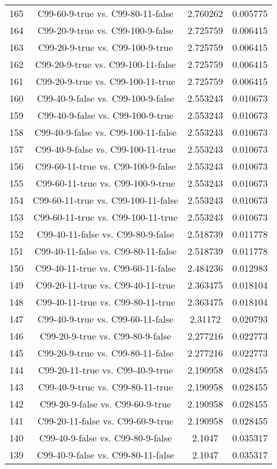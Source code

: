 \documentclass[a4paper,10pt]{article}
\begin{document}
\begin{landscape}
\begin{table}[!htp]
\begin{tabular}{cccc}
165&C99-60-9-true vs. C99-80-11-false&2.760262&0.005775\\
164&C99-20-9-true vs. C99-100-9-false&2.725759&0.006415\\
163&C99-20-9-true vs. C99-100-9-true&2.725759&0.006415\\
162&C99-20-9-true vs. C99-100-11-false&2.725759&0.006415\\
161&C99-20-9-true vs. C99-100-11-true&2.725759&0.006415\\
160&C99-40-9-false vs. C99-100-9-false&2.553243&0.010673\\
159&C99-40-9-false vs. C99-100-9-true&2.553243&0.010673\\
158&C99-40-9-false vs. C99-100-11-false&2.553243&0.010673\\
157&C99-40-9-false vs. C99-100-11-true&2.553243&0.010673\\
156&C99-60-11-true vs. C99-100-9-false&2.553243&0.010673\\
155&C99-60-11-true vs. C99-100-9-true&2.553243&0.010673\\
154&C99-60-11-true vs. C99-100-11-false&2.553243&0.010673\\
153&C99-60-11-true vs. C99-100-11-true&2.553243&0.010673\\
152&C99-40-11-false vs. C99-80-9-false&2.518739&0.011778\\
151&C99-40-11-false vs. C99-80-11-false&2.518739&0.011778\\
150&C99-40-11-true vs. C99-60-11-false&2.484236&0.012983\\
149&C99-20-11-true vs. C99-40-11-true&2.363475&0.018104\\
148&C99-40-11-true vs. C99-80-11-true&2.363475&0.018104\\
147&C99-40-9-true vs. C99-60-11-false&2.31172&0.020793\\
146&C99-20-9-true vs. C99-80-9-false&2.277216&0.022773\\
145&C99-20-9-true vs. C99-80-11-false&2.277216&0.022773\\
144&C99-20-11-true vs. C99-40-9-true&2.190958&0.028455\\
143&C99-40-9-true vs. C99-80-11-true&2.190958&0.028455\\
142&C99-20-9-false vs. C99-60-9-true&2.190958&0.028455\\
141&C99-20-11-false vs. C99-60-9-true&2.190958&0.028455\\
140&C99-40-9-false vs. C99-80-9-false&2.1047&0.035317\\
139&C99-40-9-false vs. C99-80-11-false&2.1047&0.035317\\

\end{tabular}
\end{table}
\end{landscape}
\end{document}
